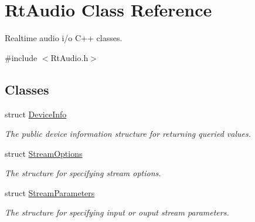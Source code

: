\hypertarget{class_rt_audio}{}\section{Rt\+Audio Class Reference}
\label{class_rt_audio}


Realtime audio i/o C++ classes.  




{\ttfamily \#include $<$Rt\+Audio.\+h$>$}

\subsection*{Classes}
\begin{DoxyCompactItemize}
\item 
struct \hyperlink{struct_rt_audio_1_1_device_info}{Device\+Info}
\begin{DoxyCompactList}\small\item\em The public device information structure for returning queried values. \end{DoxyCompactList}\item 
struct \hyperlink{struct_rt_audio_1_1_stream_options}{Stream\+Options}
\begin{DoxyCompactList}\small\item\em The structure for specifying stream options. \end{DoxyCompactList}\item 
struct \hyperlink{struct_rt_audio_1_1_stream_parameters}{Stream\+Parameters}
\begin{DoxyCompactList}\small\item\em The structure for specifying input or ouput stream parameters. \end{DoxyCompactList}\end{DoxyCompactItemize}
